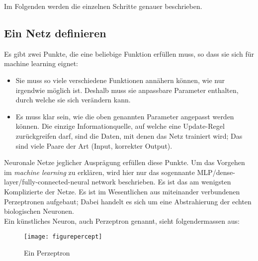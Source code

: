 \documentclass[12pt,a4paper]{article}
\begin{document}
Im Folgenden werden die einzelnen Schritte genauer beschrieben.
\newpage
\subsection{Ein Netz definieren}
Es gibt zwei Punkte, die eine beliebige Funktion erfüllen muss, so dass sie sich für machine learning eignet:
\begin{itemize}
\item{Sie muss so viele verschiedene Funktionen annähern können, wie nur irgendwie möglich ist. Deshalb muss sie anpassbare Parameter enthalten, durch welche sie sich verändern kann.}
\item{Es muss klar sein, wie die oben genannten Parameter angepasst werden können. Die einzige Informationquelle, auf welche eine Update-Regel zurückgreifen darf, sind die Daten, mit denen das Netz trainiert wird; Das sind viele Paare der Art (Input, korrekter Output).}
\end{itemize}

Neuronale Netze jeglicher Ausprägung erfüllen diese Punkte. Um das Vorgehen im \textit{machine learning} zu erklären, wird hier nur das sogennante MLP/dense-layer/fully-connected-neural network beschrieben. Es ist das am wenigsten Komplizierte der Netze. Es ist im Wesentlichen aus miteinander verbundenen Perzeptronen aufgebaut; Dabei handelt es sich um eine Abstrahierung der echten biologischen Neuronen\cite{perceptron}.\\
Ein künstliches Neuron, auch Perzeptron genannt, sieht folgendermassen aus:
\begin{figure}[hbt]
\centering
\texttt{[image: figurepercept]}
\caption{ Ein Perzeptron\cite{figurepercept}}
\end{figure}
\end{document}
